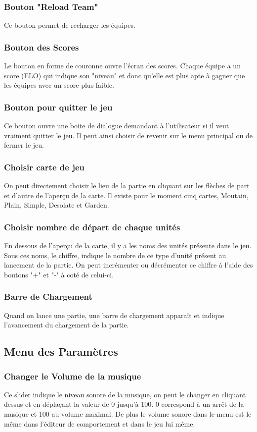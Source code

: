 \documentclass{report}
\begin{document}
\subsubsection{Bouton "Reload Team"}
Ce bouton permet de recharger les équipes.
\subsubsection{Bouton des Scores}
Le bouton en forme de couronne ouvre l'écran des scores. Chaque équipe a un score (ELO) qui indique son "niveau" et donc qu'elle est plus apte à gagner que les équipes avec un score plus faible.
\subsubsection{Bouton pour quitter le jeu}
Ce bouton ouvre une boite de dialogue demandant à l'utilisateur si il veut vraiment quitter le jeu. Il peut ainsi choisir de revenir sur le menu principal ou de fermer le jeu.
\subsubsection{Choisir carte de jeu}
On peut directement choisir le lieu de la partie en cliquant sur les flèches de part et d'autre de l’aperçu de la carte. Il existe pour le moment cinq cartes, Moutain, Plain, Simple, Desolate et Garden.
\subsubsection{Choisir nombre de départ de chaque unités}
En dessous de l’aperçu de la carte, il y a les noms des unités présente dans le jeu. Sous ces noms, le chiffre, indique le nombre de ce type d'unité présent au lancement de la partie. On peut incrémenter ou décrémenter ce chiffre à l'aide des boutons "+" et "-" à coté de celui-ci.
\subsubsection{Barre de Chargement}
Quand on lance une partie, une barre de chargement apparaît et indique l'avancement du chargement de la partie.

\subsection{Menu des Paramètres}
\subsubsection{Changer le Volume de la musique}
Ce slider indique le niveau sonore de la musique, on peut le changer en cliquant dessus et en déplaçant la valeur de 0 jusqu’à 100. 0 correspond à un arrêt de la musique et 100 au volume maximal. De plus le volume sonore dans le menu est le même dans l'éditeur de comportement et dans le jeu lui même.
\end{document}
